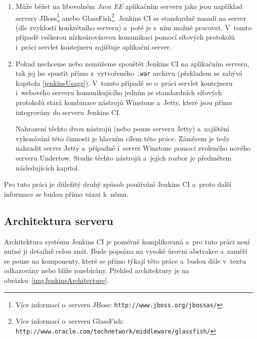             \begin{enumerate}
                \item{Může běžet na libovolném \emph{Java EE} aplikačním serveru \cite{jenkinsServers} jako jsou například servery 
                JBoss\footnote{Více informací o~serveru JBoss: \texttt{http://www.jboss.org/jbossas/}} 
                anebo GlassFish\footnote{Více informací o~serveru GlassFish: \texttt{http://www.oracle.com/technetwork/middleware/glassfish/}}}.
                Jenkins CI se standardně nasadí na server (dle zvyklostí konkrétního serveru)
                a~poté je s~ním možné pracovat. V~tomto případě veškerou nízkoúrovňovou komunikaci pomocí síťových protokolů 
                i~práci servlet kontejneru zajišťuje aplikační server.
                
                \item{Pokud nechceme nebo nemůžeme spouštět Jenkins CI na aplikačním serveru, tak jej lze spustit přímo
                    z~vytvořeného \texttt{.war} archivu (překladem se zabývá kapitola \ref{jenkinsUsage}). V~tomto případě
                    se o~práci servlet kontejneru i~webového serveru komunikujícího jedním ze standardních síťových protokolů stará 
                    kombinace nástrojů Winstone a~Jetty, které jsou přímo integrovány do serveru Jenkins CI. 
                    
                    Nahrazení těchto dvou nástrojů (nebo pouze serveru Jetty) a~zajištění vykonávání této činnosti je hlavním cílem této práce.
                    Záměrem je tedy nahradit server Jetty a~případně i~server Winstone pomocí zvoleného nového serveru Undertow.
                    Studie těchto nástrojů a~jejich rozbor je předmětem následujících kapitol.}
            \end{enumerate}

            Pro tuto práci je důležitý druhý způsob používání Jenkins CI a~proto další informace se budou přímo vázat k~němu.

         \subsection{Architektura serveru}   \label{secJenkinsArchitektura}
            Architektura systému Jenkins CI je poměrně komplikovaná a~pro tuto práci není nutné ji detailně celou znát.
            Bude popsána na vysoké úrovni abstrakce a~zaměří se pouze na komponenty, které se přímo týkají této práce
            a~budou dále v~textu odkazovány nebo blíže rozebírány. Přehled architektury je na obrázku~\ref{imgJenkinsArchitecture}.
       
